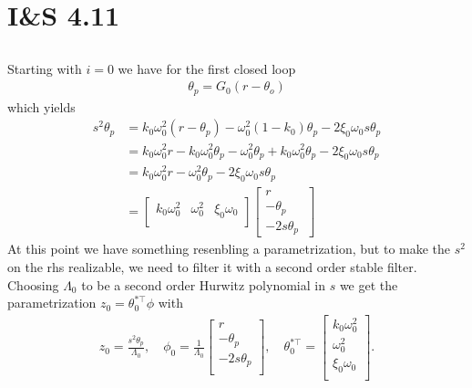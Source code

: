 \documentclass[]{article}
\begin{document}
\section{I\&S 4.11}
\subsection{}
Starting with $i=0$ we have for the first closed loop
\begin{equation}\begin{aligned}
\theta_p = G_0(r - \theta_o)
\end{aligned}\end{equation}
which yields
\begin{equation}\begin{aligned}
s^2 \theta_p &= k_0 \omega_0^2 (r-\theta_p)
-\omega_0^2(1-k_0)\theta_p
- 2 \xi_0 \omega_0 s \theta_p \\
&= k_0\omega_0^2 r - k_0 \omega_0^2 \theta_p - \omega_0^2 \theta_p + k_0 \omega_0^2 \theta_p - 2 \xi_0 \omega_0 s \theta_p \\
&=k_0 \omega_0^2 r - \omega_0^2 \theta_p - 2\xi_0 \omega_0 s \theta_p \\
&=
\begin{bmatrix}
k_0 \omega_0^2 & \omega_0^2 & \xi_0 \omega_0 \\
\end{bmatrix}
\begin{bmatrix}
r\\
-\theta_p\\
-2s\theta_p\
\end{bmatrix}
\end{aligned}\end{equation}
At this point we have something resenbling a parametrization, but to make the $s^2$ on the rhs realizable, we need to filter it with a second order stable filter. Choosing $\Lambda_0$ to be a second order Hurwitz polynomial in $s$ we get the parametrization $z_0 = \theta_0^{*\top}\phi$ with
\begin{equation}\begin{aligned}
z_0 = \frac{s^2 \theta_p}{\Lambda_0}, \quad
\phi_0 = \frac{1}{\Lambda_0}
\begin{bmatrix}
r\\
-\theta_p\\
-2s\theta_p \\
\end{bmatrix}, \quad
\theta_0^{*\top} =
\begin{bmatrix}
k_0 \omega_0^2\\
\omega_0^2 \\
\xi_0 \omega_0 \\
\end{bmatrix}.
\end{aligned}\end{equation}
\end{document}
